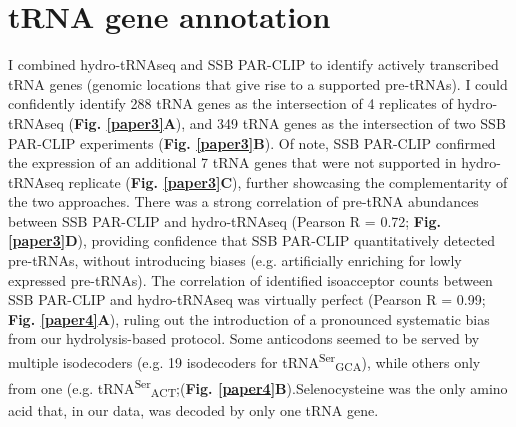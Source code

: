 \documentclass[12pt]{rockefeller}
\begin{document}
\section{tRNA gene annotation}
I combined hydro-tRNAseq and SSB PAR-CLIP to identify actively transcribed tRNA genes (genomic locations that give rise to a supported pre-tRNAs). I could confidently identify 288 tRNA genes as the intersection of 4 replicates of hydro-tRNAseq (\textbf{Fig. \ref{paper3}A}), and 349 tRNA genes as the intersection of two SSB PAR-CLIP experiments (\textbf{Fig. \ref{paper3}B}). Of note, SSB PAR-CLIP confirmed the expression of an additional 7 tRNA genes that were not supported in hydro-tRNAseq replicate (\textbf{Fig. \ref{paper3}C}), further showcasing the complementarity of the two approaches. There was a strong correlation of pre-tRNA abundances between SSB PAR-CLIP and hydro-tRNAseq (Pearson R = 0.72; \textbf{Fig. \ref{paper3}D}), providing confidence that SSB PAR-CLIP quantitatively detected pre-tRNAs, without introducing biases (e.g. artificially enriching for lowly expressed pre-tRNAs). The correlation of identified isoacceptor counts between SSB PAR-CLIP and hydro-tRNAseq was virtually perfect (Pearson R = 0.99; \textbf{Fig. \ref{paper4}A}), ruling out the introduction of a pronounced systematic bias from our hydrolysis-based protocol. Some anticodons seemed to be served by multiple isodecoders (e.g. 19 isodecoders for tRNA\textsuperscript{Ser}\textsubscript{GCA}), while others only from one (e.g. tRNA\textsuperscript{Ser}\textsubscript{ACT};(\textbf{Fig. \ref{paper4}B}).Selenocysteine was the only amino acid that, in our data, was decoded by only one tRNA gene.
\end{document}
